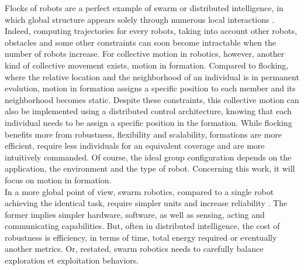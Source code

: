 \documentclass[a4paper, 12pt]{report}
\begin{document}
Flocks of robots are a perfect example of swarm or distributed intelligence, in which global structure appears solely through numerous local interactions \cite{Bonabeau1999, Reynolds1987}. Indeed, computing trajectories for every robots, taking into account other robots, obstacles and some other constraints can soon become intractable when the number of robots increase. For collective motion in robotics, however, another kind of collective movement exists, motion in formation. Compared to flocking, where the relative location and the neighborhood of an individual is in permanent evolution, motion in formation assigns a specific position to each member and its neighborhood becomes static. Despite these constraints, this collective motion can also be implemented using a distributed control architecture, knowing that each individual needs to be assign a specific position in the formation. While flocking benefits more from robustness, flexibility and scalability, formations are more efficient, require less individuals for an equivalent coverage and are more intuitively commanded. Of course, the ideal group configuration depends on the application, the environment and the type of robot. Concerning this work, it will focus on motion in formation.\\
In a more global point of view, swarm robotics, compared to a single robot achieving the identical task, require simpler units and increase reliability \cite{Beni2004}. The former implies simpler hardware, software, as well as sensing, acting and communicating capabilities. But, often in distributed intelligence, the cost of robustness is efficiency, in terms of time, total energy required or eventually another metrics. Or, restated, swarm robotics needs to carefully balance exploration et exploitation behaviors.
\end{document}
